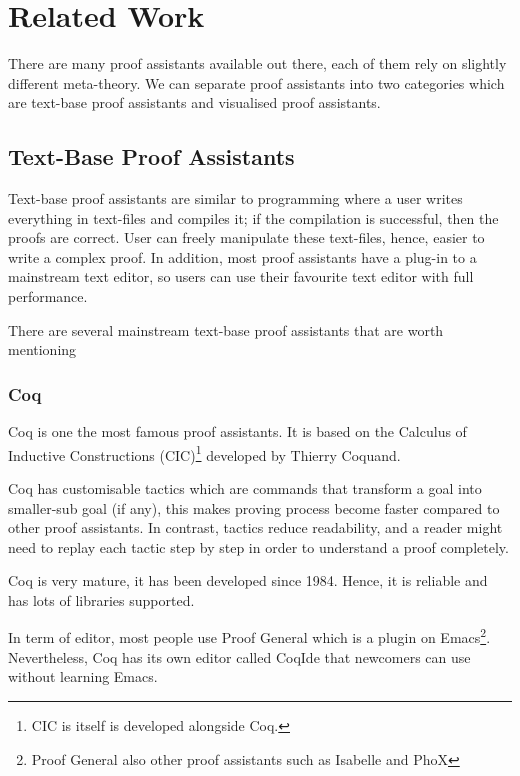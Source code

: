 \documentclass[master.tex]{subfiles}
\begin{document}
\chapter{Related Work}

There are many proof assistants available out there, each of them rely on
slightly different meta-theory. We can separate proof assistants into two
categories which are text-base proof assistants and visualised proof assistants.

\section{Text-Base Proof Assistants}

Text-base proof assistants are similar to programming where a user writes
everything in text-files and compiles it; if the compilation is successful, then
the proofs are correct. User can freely manipulate these text-files, hence,
easier to write a complex proof. In addition, most proof assistants have a
plug-in to a mainstream text editor, so users can use their favourite text editor
with full performance.

There are several mainstream text-base proof assistants that are worth
mentioning

\subsection{Coq}
Coq\supercite{coq-official-website} is one the most famous proof assistants. It
is based on the Calculus of Inductive Constructions (CIC)\footnote{CIC is itself
  is developed alongside Coq.} developed by Thierry
Coquand\supercite{thierry-coquand-homepage}.

Coq has customisable tactics which are commands that transform a goal into
smaller-sub goal (if any), this makes proving process become faster compared to
other proof assistants. In contrast, tactics reduce readability, and a reader
might need to replay each tactic step by step in order to understand a proof
completely.

Coq is very mature, it has been developed since 1984. Hence, it is reliable and
has lots of libraries supported.

In term of editor, most people use Proof
General\supercite{proof-general-official-website} which is a plugin on
Emacs\footnote{Proof General also other proof assistants such as Isabelle and PhoX}.
Nevertheless, Coq has its own editor called
CoqIde\supercite{coqide-official-website} that newcomers can use without
learning Emacs.
\end{document}
